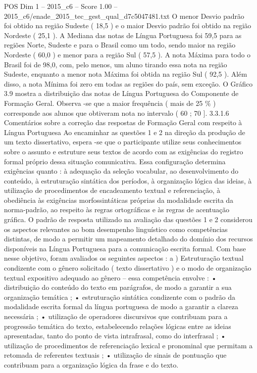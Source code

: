 \begin{textsample}{POS Dim 1 – 2015\_c6 – Score 1.00 – 2015\_c6/enade\_2015\_tec\_gest\_qual\_d7c5047481.txt}
O menor Desvio padrão foi obtido na região Sudeste ( 18,5 ) e o maior Desvio padrão foi obtido na região Nordeste ( 25,1 ).
A Mediana das notas de Língua Portuguesa foi 59,5 para as regiões Norte, Sudeste e para o Brasil como um todo, sendo maior na região Nordeste ( 60,0 ) e menor para a região Sul ( 57,5 ).
A nota Máxima para todo o Brasil foi de 98,0, com, pelo menos, um aluno tirando essa nota na região Sudeste, enquanto a menor nota Máxima foi obtida na região Sul ( 92,5 ).
Além disso, a nota Mínima foi zero em todas as regiões do país, sem exceção.
O Gráfico 3.9 mostra a distribuição das notas de Língua Portuguesa do Componente de Formação Geral.
Observa -se que a maior frequência ( mais de 25 \% ) corresponde aos alunos que obtiveram nota no intervalo ( 60 ; 70 ]. 3.3.1.6 Comentários sobre a correção das respostas de Formação Geral com respeito à Língua Portuguesa Ao encaminhar as questões 1 e 2 na direção da produção de um texto dissertativo, espera -se que o participante utilize seus conhecimentos sobre o assunto e estruture seus textos de acordo com as exigências do registro formal próprio dessa situação comunicativa.
Essa configuração determina exigências quanto : à adequação da seleção vocabular, ao desenvolvimento do conteúdo, à estruturação sintática dos períodos, à organização lógica das ideias, à utilização de procedimentos de encadeamento textual e referenciação, à obediência às exigências morfossintáticas próprias da modalidade escrita da norma-padrão, ao respeito às regras ortográficas e às regras de acentuação gráfica.
O padrão de resposta utilizado na avaliação das questões 1 e 2 considerou os aspectos relevantes ao bom desempenho linguístico como competências distintas, de modo a permitir um mapeamento detalhado do domínio dos recursos disponíveis na Língua Portuguesa para a comunicação escrita formal.
Com base nesse objetivo, foram avaliados os seguintes aspectos : a ) Estruturação textual condizente com o gênero solicitado ( texto dissertativo ) e o modo de organização textual expositivo adequado ao gênero – essa competência envolve : • distribuição do conteúdo do texto em parágrafos, de modo a garantir a sua organização temática ; • estruturação sintática condizente com o padrão da modalidade escrita formal da língua portuguesa de modo a garantir a clareza necessária ; • utilização de operadores discursivos que contribuam para a progressão temática do texto, estabelecendo relações lógicas entre as ideias apresentadas, tanto do ponto de vista intrafrasal, como do interfrasal ; • utilização de procedimentos de referenciação lexical e pronominal que permitam a retomada de referentes textuais ; • utilização de sinais de pontuação que contribuam para a organização lógica da frase e do texto.

\end{textsample}
